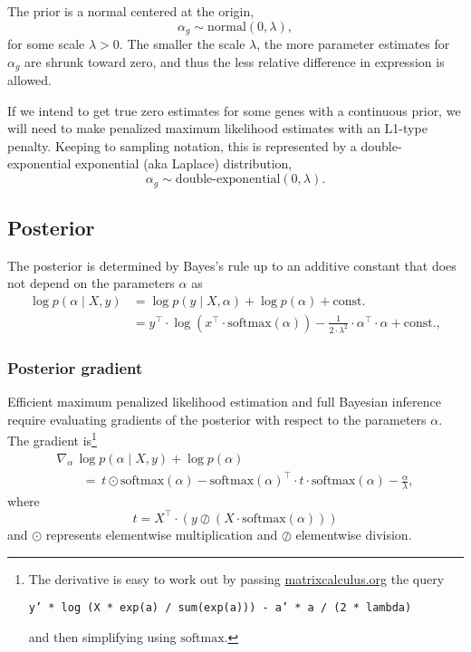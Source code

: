 \documentclass[11pt]{article}
\begin{document}
The prior is a normal centered at the origin,
\[
  \alpha_g \sim \textrm{normal}(0, \lambda),
\]
for some scale $\lambda > 0$.  The smaller the scale $\lambda$, the
more parameter estimates for $\alpha_g$ are shrunk toward zero, and
thus the less relative difference in expression is allowed.

If we intend to get true zero estimates for some genes with a
continuous prior, we will need to make penalized maximum likelihood
estimates with an L1-type penalty.  Keeping to sampling notation, this
is represented by a double-exponential exponential (aka Laplace)
distribution,
\[
  \alpha_g \sim \textrm{double-exponential}(0, \lambda).
\]

\subsection{Posterior}

The posterior is determined by Bayes's rule up to an additive constant
that does not depend on the parameters $\alpha$ as
\begin{align}
  \log p(\alpha \mid X, y)& = \log p(y \mid X, \alpha) + \log p(\alpha) +
  \textrm{const.} \nonumber \\
  &= y^{\top} \cdot \log \left( x^{\top} \cdot \textrm{softmax}(\alpha) \right)
          - \frac{1}{2 \cdot \lambda^2} \cdot \alpha^{\top} \cdot \alpha +\textrm{const.}, \nonumber
\end{align} 
 


\subsubsection{Posterior gradient}

Efficient maximum penalized likelihood estimation and full Bayesian inference
require evaluating gradients of the posterior with respect to the parameters
$\alpha$.  The gradient is\footnote{The derivative is easy to work out
  by passing \url{matrixcalculus.org} the query
  \begin{center}\texttt{y' * log
(X * exp(a) / sum(exp(a))) - a' * a / (2 * lambda)}\end{center}
and then simplifying using $\textrm{softmax}$.}
%
\[
  \begin{array}{l}
  \nabla\!_{\alpha} \, \log p(\alpha \mid X, y) + \log p(\alpha)
  \\[4pt]
  \qquad = \
    t \odot \textrm{softmax}(\alpha)
    - \textrm{softmax}(\alpha)^{\top}\! \cdot t \cdot \textrm{softmax}(\alpha)
    - \frac{\displaystyle \alpha}{\displaystyle \lambda},
\end{array}
\]
where
\[
  t = X^{\top}\! \cdot (y \oslash (X \cdot \textrm{softmax}(\alpha)))
\]
and $\odot$ represents elementwise multiplication and $\oslash$
elementwise division.
\end{document}
